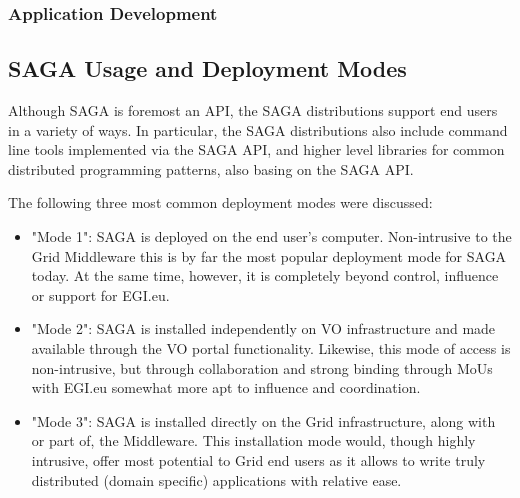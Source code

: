 \documentclass[10pt,conference,final,letterpaper,twoside,twocolumn,]{IEEEtran}
\begin{document}
\subsubsection*{Application Development}






\subsection{SAGA Usage and Deployment Modes}

Although SAGA is foremost an API, the SAGA distributions support end
users in a variety of ways.  In particular, the SAGA distributions
also include command line tools implemented via the SAGA API, and
higher level libraries for common distributed programming patterns,
also basing on the SAGA API.


The following three most common deployment modes were discussed:

\begin{itemize}

\item "Mode 1": SAGA is deployed on the end user's
  computer. Non-intrusive to the Grid Middleware this is by far the
  most popular deployment mode for SAGA today. At the same time,
  however, it is completely beyond control, influence or support for
  EGI.eu.

\item "Mode 2": SAGA is installed independently on VO infrastructure
  and made available through the VO portal functionality. Likewise,
  this mode of access is non-intrusive, but through collaboration and
  strong binding through MoUs with EGI.eu somewhat more apt to
  influence and coordination.

\item "Mode 3": SAGA is installed directly on the Grid infrastructure,
  along with or part of, the Middleware. This installation mode would,
  though highly intrusive, offer most potential to Grid end users as
  it allows to write truly distributed (domain specific) applications
  with relative ease.

\end{itemize}
\end{document}
